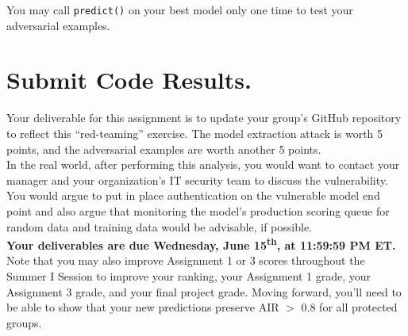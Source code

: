 \documentclass[fleqn]{article}
\begin{document}
\noindent You may call \texttt{predict()} on your best model only one time to test your adversarial examples.

\section{Submit Code Results.}

Your deliverable for this assignment is to update your group's GitHub repository to reflect this ``red-teaming'' exercise. The model extraction attack is worth 5 points, and the adversarial examples are worth another 5 points. \\

\noindent In the real world, after performing this analysis, you would want to contact your manager and your organization's IT security team to discuss the vulnerability. You would argue to put in place authentication on the vulnerable model end point and also argue that monitoring the model's production scoring queue for random data and training data would be advisable, if possible.\\

\noindent \textbf{Your deliverables are due Wednesday, June 15\textsuperscript{th}, at 11:59:59 PM ET.}\\

\noindent Note that you may also improve Assignment 1 or 3 scores throughout the Summer I Session to improve your ranking, your Assignment 1 grade, your Assignment 3 grade, and your final project grade. Moving forward, you'll need to be able to show that your new predictions preserve AIR $>$ 0.8 for all protected groups.
\end{document}
